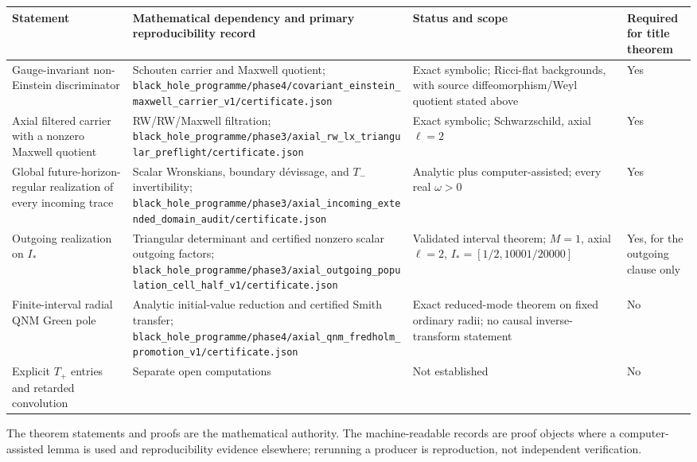 \documentclass[11pt]{article}
\theoremstyle{definition}
\theoremstyle{remark}
\newcommand{\cert}[1]{\nolinkurl{#1}}
\begin{document}
\scriptsize
\begin{tabularx}{\textwidth}{@{}p{}Y Y
>{\centering\arraybackslash}p{0.09\textwidth}@{}}
\toprule
Statement & Mathematical dependency and primary reproducibility record &
Status and scope & Required for title theorem\\
\midrule
Gauge-invariant non-Einstein discriminator &
Schouten carrier and Maxwell quotient;
\cert{black_hole_programme/phase4/covariant_einstein_maxwell_carrier_v1/certificate.json} &
Exact symbolic; Ricci-flat backgrounds, with source diffeomorphism/Weyl
quotient stated above & Yes\\
Axial filtered carrier with a nonzero Maxwell quotient &
RW/RW/Maxwell filtration;
\cert{black_hole_programme/phase3/axial_rw_lx_triangular_preflight/certificate.json} &
Exact symbolic; Schwarzschild, axial \(\ell=2\) & Yes\\
Global future-horizon-regular realization of every incoming trace &
Scalar Wronskians, boundary d\'evissage, and \(T_-\) invertibility;
\cert{black_hole_programme/phase3/axial_incoming_extended_domain_audit/certificate.json} &
Analytic plus computer-assisted; every real \(\omega>0\) & Yes\\
Outgoing realization on \(I_*\) &
Triangular determinant and certified nonzero scalar outgoing factors;
\cert{black_hole_programme/phase3/axial_outgoing_population_cell_half_v1/certificate.json} &
Validated interval theorem; \(M=1\), axial \(\ell=2\),
\(I_*=[1/2,10001/20000]\) & Yes, for the outgoing clause only\\
Finite-interval radial QNM Green pole &
Analytic initial-value reduction and certified Smith transfer;
\cert{black_hole_programme/phase4/axial_qnm_fredholm_promotion_v1/certificate.json} &
Exact reduced-mode theorem on fixed ordinary radii; no causal
inverse-transform statement & No\\
Explicit \(T_+\) entries and retarded convolution &
Separate open computations & Not established & No\\
\bottomrule
\end{tabularx}
\normalsize

The theorem statements and proofs are the mathematical authority.  The
machine-readable records are proof objects where a computer-assisted lemma
is used and reproducibility evidence elsewhere; rerunning a producer is
reproduction, not independent verification.
\end{document}
